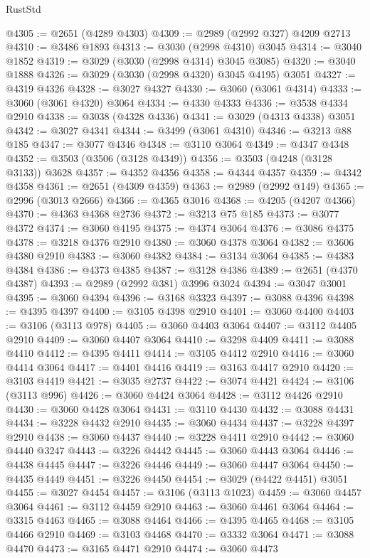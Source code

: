 \begin{lexlean}{RustStd}
\begin{coremodule}
@4305 := @2651 (@4289 @4303)
@4309 := @2989 (@2992 @327) @4209 @2713
@4310 := @3486 @1893
@4313 := @3030 (@2998 @4310) @3045
@4314 := @3040 @1852
@4319 := @3029 (@3030 (@2998 @4314) @3045 @3085)
@4320 := @3040 @1888
@4326 := @3029 (@3030 (@2998 @4320) @3045 @4195) @3051
@4327 := @4319 @4326
@4328 := @3027 @4327
@4330 := @3060 (@3061 @4314)
@4333 := @3060 (@3061 @4320) @3064
@4334 := @4330 @4333
@4336 := @3538 @4334 @2910
@4338 := @3038 (@4328 @4336)
@4341 := @3029 (@4313 @4338) @3051
@4342 := @3027 @4341
@4344 := @3499 (@3061 @4310)
@4346 := @3213 @88 @185
@4347 := @3077 @4346
@4348 := @3110 @3064
@4349 := @4347 @4348
@4352 := @3503 (@3506 (@3128 @4349))
@4356 := @3503 (@4248 (@3128 @3133)) @3628
@4357 := @4352 @4356
@4358 := @4344 @4357
@4359 := @4342 @4358
@4361 := @2651 (@4309 @4359)
@4363 := @2989 (@2992 @149)
@4365 := @2996 (@3013 @2666)
@4366 := @4365 @3016
@4368 := @4205 (@4207 @4366)
@4370 := @4363 @4368 @2736
@4372 := @3213 @75 @185
@4373 := @3077 @4372
@4374 := @3060 @4195
@4375 := @4374 @3064
@4376 := @3086 @4375
@4378 := @3218 @4376 @2910
@4380 := @3060 @4378 @3064
@4382 := @3606 @4380 @2910
@4383 := @3060 @4382
@4384 := @3134 @3064
@4385 := @4383 @4384
@4386 := @4373 @4385
@4387 := @3128 @4386
@4389 := @2651 (@4370 @4387)
@4393 := @2989 (@2992 @381) @3996 @3024
@4394 := @3047 @3001
@4395 := @3060 @4394
@4396 := @3168 @3323
@4397 := @3088 @4396
@4398 := @4395 @4397
@4400 := @3105 @4398 @2910
@4401 := @3060 @4400
@4403 := @3106 (@3113 @978)
@4405 := @3060 @4403 @3064
@4407 := @3112 @4405 @2910
@4409 := @3060 @4407 @3064
@4410 := @3298 @4409
@4411 := @3088 @4410
@4412 := @4395 @4411
@4414 := @3105 @4412 @2910
@4416 := @3060 @4414 @3064
@4417 := @4401 @4416
@4419 := @3163 @4417 @2910
@4420 := @3103 @4419
@4421 := @3035 @2737
@4422 := @3074 @4421
@4424 := @3106 (@3113 @996)
@4426 := @3060 @4424 @3064
@4428 := @3112 @4426 @2910
@4430 := @3060 @4428 @3064
@4431 := @3110 @4430
@4432 := @3088 @4431
@4434 := @3228 @4432 @2910
@4435 := @3060 @4434
@4437 := @3228 @4397 @2910
@4438 := @3060 @4437
@4440 := @3228 @4411 @2910
@4442 := @3060 @4440 @3247
@4443 := @3226 @4442
@4445 := @3060 @4443 @3064
@4446 := @4438 @4445
@4447 := @3226 @4446
@4449 := @3060 @4447 @3064
@4450 := @4435 @4449
@4451 := @3226 @4450
@4454 := @3029 (@4422 @4451) @3051
@4455 := @3027 @4454
@4457 := @3106 (@3113 @1023)
@4459 := @3060 @4457 @3064
@4461 := @3112 @4459 @2910
@4463 := @3060 @4461 @3064
@4464 := @3315 @4463
@4465 := @3088 @4464
@4466 := @4395 @4465
@4468 := @3105 @4466 @2910
@4469 := @3103 @4468
@4470 := @3332 @3064
@4471 := @3088 @4470
@4473 := @3165 @4471 @2910
@4474 := @3060 @4473

\end{coremodule}
\end{lexlean}
